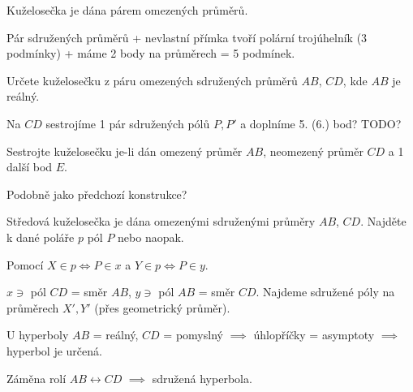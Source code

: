 \documentclass[12pt]{article}					%
\begin{document}
\begin{veta}
	Kuželosečka je dána párem omezených průměrů.

	\begin{dukazin}
		Pár sdružených průměrů + nevlastní přímka tvoří polární trojúhelník (3 podmínky) + máme 2 body na průměrech = 5 podmínek.
	\end{dukazin}
\end{veta}

\begin{priklad}[Konstrukce]
	Určete kuželosečku z páru omezených sdružených průměrů $AB$, $CD$, kde $AB$ je reálný.

	\begin{reseni}
		Na $CD$ sestrojíme 1 pár sdružených pólů $P, P'$ a doplníme 5. (6.) bod? TODO?
	\end{reseni}
\end{priklad}

\begin{priklad}[Konstrukce]
	Sestrojte kuželosečku je-li dán omezený průměr $AB$, neomezený průměr $CD$ a 1 další bod $E$.

	\begin{reseni}
		Podobně jako předchozí konstrukce?
	\end{reseni}
\end{priklad}

\begin{priklad}[Konstrukce]
	Středová kuželosečka je dána omezenými sdruženými průměry $AB$, $CD$. Najděte k dané poláře $p$ pól $P$ nebo naopak.

	\begin{reseni}
		Pomocí $X \in p \Leftrightarrow P \in x$ a $Y \in p \Leftrightarrow P \in y$.

		$x \ni$ pól $CD$ = směr $AB$, $y \ni$ pól $AB$ = směr $CD$. Najdeme sdružené póly na průměrech $X', Y'$ (přes geometrický průměr).
	\end{reseni}
\end{priklad}

\begin{poznamka}
	U hyperboly $AB$ = reálný, $CD$ = pomyslný $\implies$ úhlopříčky = asymptoty $\implies$ hyperbol je určená.

	Záměna rolí $AB \leftrightarrow CD$ $\implies$ sdružená hyperbola.
\end{poznamka}

\end{document}
